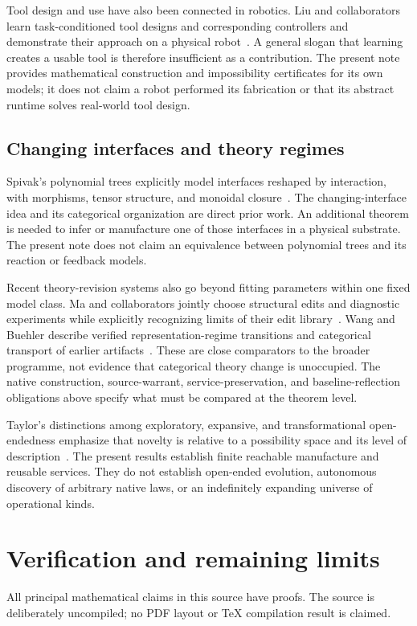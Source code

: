 \documentclass[11pt]{article}
\theoremstyle{definition}
\theoremstyle{remark}
\begin{document}
Tool design and use have also been connected in robotics.
Liu and collaborators learn task-conditioned tool designs and
corresponding controllers and demonstrate their approach on a physical
robot~\cite{Liu2023}. A general slogan that learning creates a usable
tool is therefore insufficient as a contribution. The present note
provides mathematical construction and impossibility certificates for
its own models; it does not claim a robot performed its fabrication or
that its abstract runtime solves real-world tool design.

\subsection{Changing interfaces and theory regimes}
Spivak's polynomial trees explicitly model interfaces reshaped by
interaction, with morphisms, tensor structure, and monoidal
closure~\cite{Spivak2026}. The changing-interface idea and its categorical
organization are direct prior work. An additional theorem is needed to
infer or manufacture one of those interfaces in a physical substrate.
The present note does not claim an equivalence between polynomial trees
and its reaction or feedback models.

Recent theory-revision systems also go beyond fitting parameters within
one fixed model class. Ma and collaborators jointly choose structural
edits and diagnostic experiments while explicitly recognizing limits of
their edit library~\cite{Ma2026}. Wang and Buehler describe verified
representation-regime transitions and categorical transport of earlier
artifacts~\cite{WangBuehler2026}. These are close comparators to the broader
programme, not evidence that categorical theory change is unoccupied.
The native construction, source-warrant, service-preservation, and
baseline-reflection obligations above specify what must be compared at
the theorem level.

Taylor's distinctions among exploratory, expansive, and transformational
open-endedness emphasize that novelty is relative to a possibility
space and its level of description~\cite{Taylor2019}. The present results
establish finite reachable manufacture and reusable services. They do
not establish open-ended evolution, autonomous discovery of arbitrary
native laws, or an indefinitely expanding universe of operational kinds.

\section{Verification and remaining limits}\label{sec:verification}
All principal mathematical claims in this source have proofs. The source
is deliberately uncompiled; no PDF layout or TeX compilation result is
claimed.
\end{document}
